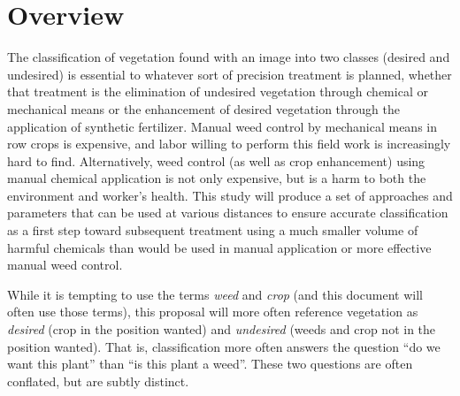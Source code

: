\documentclass[12pt]{article}
\begin{document}
{
\begin{versionhistory}
\end{versionhistory}
\newpage
}


%
%

\section{Overview}
\label{section:proposal}
The classification of vegetation found with an image into two classes (desired and undesired) is essential to whatever sort of precision treatment is planned, whether that treatment is the elimination of undesired vegetation through chemical or mechanical means or the enhancement of desired vegetation through the application of synthetic fertilizer. Manual weed control by mechanical means in row crops is expensive, and labor willing to perform this field work is increasingly hard to find. Alternatively, weed control (as well as crop enhancement) using manual chemical application is not only expensive, but is a harm to both the environment and worker's health.  This study will produce a set of approaches and parameters that can be used at various distances to ensure accurate classification as a first step toward subsequent treatment using a much smaller volume of harmful chemicals than would be used in manual application or more effective manual weed control.

 While it is tempting to use the terms \textit{weed} and \textit{crop} (and this document will often use those terms), this proposal will more often reference vegetation as \textit{desired} (crop in the position wanted) and \textit{undesired} (weeds and crop not in the position wanted).  That is, classification more often answers the question ``do we want this plant'' than ``is this plant a weed''. These two questions are often conflated, but are subtly distinct.
\end{document}
